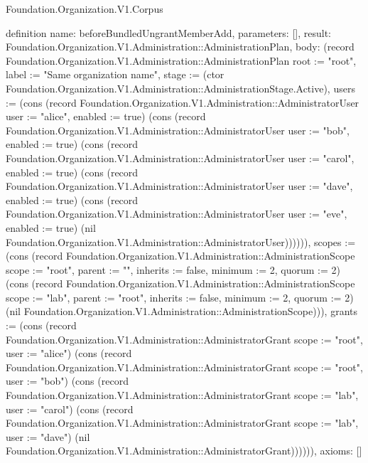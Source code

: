 \begin{lexlean}{Foundation.Organization.V1.Corpus}
\begin{semanticmodule}
definition{
  name: beforeBundledUngrantMemberAdd,
  parameters: [],
  result: Foundation.Organization.V1.Administration::AdministrationPlan,
  body: (record Foundation.Organization.V1.Administration::AdministrationPlan {root := "root", label := "Same organization name", stage := (ctor Foundation.Organization.V1.Administration::AdministrationStage.Active), users := (cons (record Foundation.Organization.V1.Administration::AdministratorUser {user := "alice", enabled := true}) (cons (record Foundation.Organization.V1.Administration::AdministratorUser {user := "bob", enabled := true}) (cons (record Foundation.Organization.V1.Administration::AdministratorUser {user := "carol", enabled := true}) (cons (record Foundation.Organization.V1.Administration::AdministratorUser {user := "dave", enabled := true}) (cons (record Foundation.Organization.V1.Administration::AdministratorUser {user := "eve", enabled := true}) (nil Foundation.Organization.V1.Administration::AdministratorUser)))))), scopes := (cons (record Foundation.Organization.V1.Administration::AdministrationScope {scope := "root", parent := "", inherits := false, minimum := 2, quorum := 2}) (cons (record Foundation.Organization.V1.Administration::AdministrationScope {scope := "lab", parent := "root", inherits := false, minimum := 2, quorum := 2}) (nil Foundation.Organization.V1.Administration::AdministrationScope))), grants := (cons (record Foundation.Organization.V1.Administration::AdministratorGrant {scope := "root", user := "alice"}) (cons (record Foundation.Organization.V1.Administration::AdministratorGrant {scope := "root", user := "bob"}) (cons (record Foundation.Organization.V1.Administration::AdministratorGrant {scope := "lab", user := "carol"}) (cons (record Foundation.Organization.V1.Administration::AdministratorGrant {scope := "lab", user := "dave"}) (nil Foundation.Organization.V1.Administration::AdministratorGrant)))))}),
  axioms: []
}


\end{semanticmodule}
\end{lexlean}

